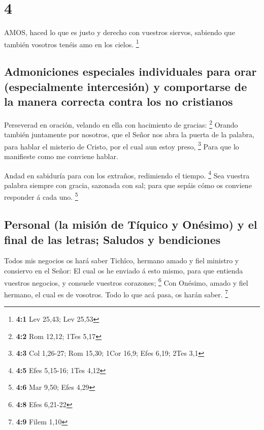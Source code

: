 \hypertarget{section-3}{%
\section{4}\label{section-3}}

 AMOS, haced lo que es justo y derecho con vuestros siervos,
sabiendo que también vosotros tenéis amo en los cielos. \footnote{\textbf{4:1}
  Lev 25,43; Lev 25,53}

\hypertarget{admoniciones-especiales-individuales-para-orar-especialmente-intercesiuxf3n-y-comportarse-de-la-manera-correcta-contra-los-no-cristianos}{%
\subsection{Admoniciones especiales individuales para orar
(especialmente intercesión) y comportarse de la manera correcta contra
los no
cristianos}\label{admoniciones-especiales-individuales-para-orar-especialmente-intercesiuxf3n-y-comportarse-de-la-manera-correcta-contra-los-no-cristianos}}

 Perseverad en oración, velando en ella con hacimiento de
gracias: \footnote{\textbf{4:2} Rom 12,12; 1Tes 5,17} 
Orando también juntamente por nosotros, que el Señor nos abra la puerta
de la palabra, para hablar el misterio de Cristo, por el cual aun estoy
preso, \footnote{\textbf{4:3} Col 1,26-27; Rom 15,30; 1Cor 16,9; Efes
  6,19; 2Tes 3,1}  Para que lo manifieste como me conviene
hablar.

 Andad en sabiduría para con los extraños, redimiendo el
tiempo. \footnote{\textbf{4:5} Efes 5,15-16; 1Tes 4,12}  Sea
vuestra palabra siempre con gracia, sazonada con sal; para que sepáis
cómo os conviene responder á cada uno. \footnote{\textbf{4:6} Mar 9,50;
  Efes 4,29}

\hypertarget{personal-la-misiuxf3n-de-tuxedquico-y-onuxe9simo-y-el-final-de-las-letras-saludos-y-bendiciones}{%
\subsection{Personal (la misión de Tíquico y Onésimo) y el final de las
letras; Saludos y
bendiciones}\label{personal-la-misiuxf3n-de-tuxedquico-y-onuxe9simo-y-el-final-de-las-letras-saludos-y-bendiciones}}

 Todos mis negocios os hará saber Tichîco, hermano amado y
fiel ministro y consiervo en el Señor:  El cual os he
enviado á esto mismo, para que entienda vuestros negocios, y consuele
vuestros corazones; \footnote{\textbf{4:8} Efes 6,21-22} 
Con Onésimo, amado y fiel hermano, el cual es de vosotros. Todo lo que
acá pasa, os harán saber. \footnote{\textbf{4:9} Filem 1,10}

